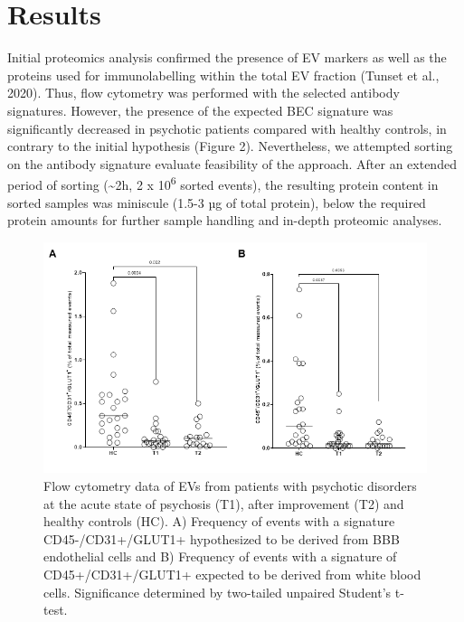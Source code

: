 \documentclass[authordate, empirical]{jote-new-article}
\begin{document}
	\section{Results}



	Initial proteomics analysis confirmed the presence of EV markers as well as the proteins used for immunolabelling within the total EV fraction (Tunset et al., 2020). Thus, flow cytometry was performed with the selected antibody signatures. However, the presence of the expected BEC signature was significantly decreased in psychotic patients compared with healthy controls, in contrary to the initial hypothesis (Figure 2). Nevertheless, we attempted sorting on the antibody signature evaluate feasibility of the approach. After an extended period of sorting (\textasciitilde{}2h, 2 x 10\textsuperscript{6} sorted events), the resulting protein content in sorted samples was miniscule (1.5-3 µg of total protein), below the required protein amounts for further sample handling and in-depth proteomic analyses.



	\begin{figure}
		\includegraphics[width=\linewidth]{media/image2.png}

		\caption{Flow cytometry data of EVs from patients with psychotic disorders at the acute state of psychosis (T1), after improvement (T2) and healthy controls (HC). A) Frequency of events with a signature CD45-/CD31+/GLUT1+ hypothesized to be derived from BBB endothelial cells and B) Frequency of events with a signature of CD45+/CD31+/GLUT1+ expected to be derived from white blood cells. Significance determined by two-tailed unpaired Student's t-test.}

		\label{fig:rId9}


	\end{figure}
\end{document}
